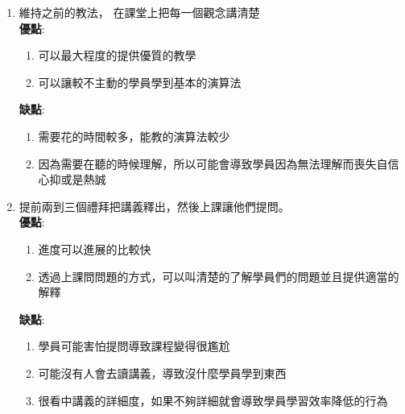 \documentclass[12pt,oneside]{article}
\begin{document}
\vspace*{2em}
\begin{adjustwidth}{2em}{0em}
\begin{enumerate}
    \item 
        維持之前的教法，
        在課堂上把每一個觀念講清楚\\
        \textbf{優點}: 
        \begin{adjustwidth}{2em}{0em}
            \begin{enumerate}
                \item 可以最大程度的提供優質的教學
                \item 可以讓較不主動的學員學到基本的演算法
            \end{enumerate}
        \end{adjustwidth} 

        \textbf{缺點}: 
        \begin{adjustwidth}{2em}{0em}
            \begin{enumerate}
                \item 需要花的時間較多，能教的演算法較少
                \item 因為需要在聽的時候理解，所以可能會導致學員因為無法理解而喪失自信心抑或是熱誠
            \end{enumerate}
        \end{adjustwidth}
    
    \vspace*{2em}
    \item 
        提前兩到三個禮拜把講義釋出，然後上課讓他們提問。\\
        \textbf{優點}:
        \begin{adjustwidth}{2em}{0em}
            \begin{enumerate}
                \item 進度可以進展的比較快
                \item 透過上課問問題的方式，可以叫清楚的了解學員們的問題並且提供適當的解釋
            \end{enumerate}
        \end{adjustwidth}
        
        \textbf{缺點}: 
        \begin{adjustwidth}{2em}{0em}
            \begin{enumerate}
                \item 學員可能害怕提問導致課程變得很尷尬
                \item 可能沒有人會去讀講義，導致沒什麼學員學到東西
                \item 很看中講義的詳細度，如果不夠詳細就會導致學員學習效率降低的行為
            \end{enumerate}
        \end{adjustwidth}


\end{enumerate}
\end{adjustwidth}
\end{document}
